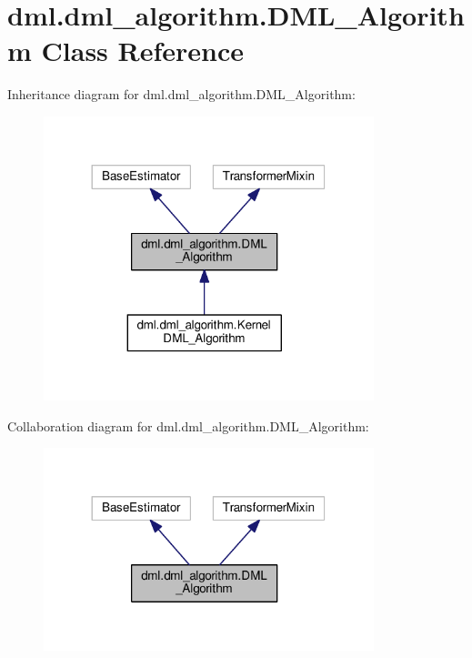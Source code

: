 \hypertarget{classdml_1_1dml__algorithm_1_1DML__Algorithm}{}\section{dml.\+dml\+\_\+algorithm.\+D\+M\+L\+\_\+\+Algorithm Class Reference}
\label{classdml_1_1dml__algorithm_1_1DML__Algorithm}


Inheritance diagram for dml.\+dml\+\_\+algorithm.\+D\+M\+L\+\_\+\+Algorithm\+:\nopagebreak
\begin{figure}[H]
\begin{center}
\leavevmode
\includegraphics[width=272pt]{classdml_1_1dml__algorithm_1_1DML__Algorithm__inherit__graph}
\end{center}
\end{figure}


Collaboration diagram for dml.\+dml\+\_\+algorithm.\+D\+M\+L\+\_\+\+Algorithm\+:\nopagebreak
\begin{figure}[H]
\begin{center}
\leavevmode
\includegraphics[width=272pt]{classdml_1_1dml__algorithm_1_1DML__Algorithm__coll__graph}
\end{center}
\end{figure}
